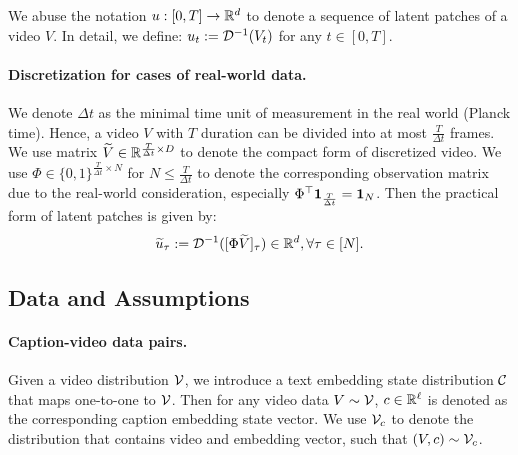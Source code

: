 We abuse the notation $u: [0, T] \rightarrow \mathbb{R}^d$ to denote a sequence of latent patches of a video $V$. In detail, we define: $u_t := {\cal D}^{-1}(V_t)$ for any $t \in [0, T]$.

\paragraph{Discretization for cases of real-world data.} We denote $\Delta t$ as the minimal time unit of measurement in the real world (Planck time). Hence, a video $V$ with $T$ duration can be divided into at most $\frac{T}{\Delta t}$ frames. We use matrix $\widetilde{V} \in \mathbb{R}^{\frac{T}{\Delta t} \times D}$ to denote the compact form of discretized video. We use $\Phi \in \{0, 1\}^{\frac{T}{\Delta t} \times N}$ for $N \leq \frac{T}{\Delta t}$ to denote the corresponding observation matrix due to the real-world consideration, especially $\Phi^\top {\bf 1}_{\frac{T}{\Delta t}} = {\bf 1}_{N}$. Then the practical form of latent patches is given by:
\begin{align}\label{eq:u_tau:informal}
    \widetilde{u}_\tau := {\cal D}^{-1}([ \Phi \widetilde{V} ]_\tau) \in \mathbb{R}^{d}, \forall \tau \in [N].
\end{align}

\subsection{Data and Assumptions}\label{sub:assumptions}

\paragraph{Caption-video data pairs.} Given a video distribution ${\cal V}$, we introduce a text embedding state distribution ${\cal C}$ that maps one-to-one to ${\cal V}$. Then for any video data $V \sim {\cal V}$, $c \in \mathbb{R}^{\ell}$ is denoted as the corresponding caption embedding state vector. We use ${\cal V}_c$ to denote the distribution that contains video and embedding vector, such that $(V, c) \sim {\cal V}_c$.

